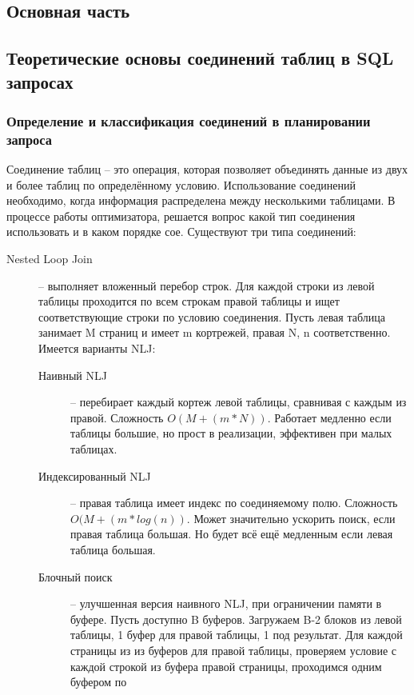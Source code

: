 \documentclass[12pt]{article}
\begin{document}
\begin{flushleft}

\centering \section*{Основная часть}
\centering \subsection*{Теоретические основы соединений таблиц в SQL запросах}
\centering \subsubsection*{Определение и классификация соединений в планировании запроса}
\raggedright
Соединение таблиц -- это операция, которая позволяет объединять данные
из двух и более таблиц по определённому условию. Использование соединений необходимо,
когда информация распределена между несколькими таблицами. В процессе работы оптимизатора,
решается вопрос какой тип соединения использовать и в каком порядке сое. 
Существуют три типа соединений:
\begin{description}
    \item[Nested Loop Join] -- выполняет вложенный перебор строк. 
    Для каждой строки из левой таблицы проходится по всем строкам правой таблицы 
    и ищет соответствующие строки по условию соединения. Пусть левая таблица 
    занимает M страниц и имеет m кортрежей, правая N, n соответственно. Имеется 
    варианты NLJ:
    \begin{description}
        \item[Наивный NLJ] -- перебирает каждый кортеж левой таблицы, 
        сравнивая с каждым из правой. Сложность $O(M+(m*N))$. Работает медленно 
        если таблицы большие, но прост в реализации, эффективен при малых 
        таблицах.
        \item[Индексированный NLJ] -- правая таблица имеет индекс по соединяемому 
        полю. Сложность $O(M+(m*log(n))$. Может значительно ускорить поиск, если 
        правая таблица большая. Но будет всё ещё медленным если левая таблица 
        большая.
        \item[Блочный поиск] -- улучшенная версия наивного NLJ, при
        ограничении памяти в буфере. Пусть доступно B буферов. Загружаем B-2 
        блоков из левой таблицы, 1 буфер для правой таблицы, 1 под результат. 
        Для каждой страницы из из буферов для правой таблицы, проверяем условие 
        с каждой строкой из буфера правой страницы, проходимся одним буфером по 

\end{description}
\end{description}
\end{flushleft}
\end{document}
